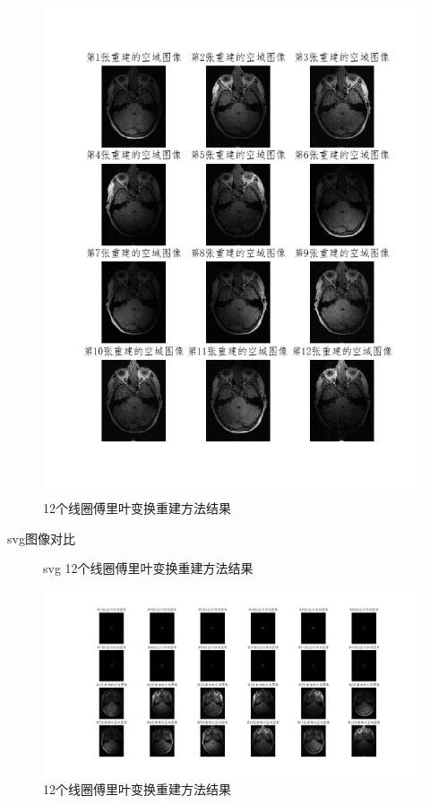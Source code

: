 \begin{figure}[H]
    \centering
    \includegraphics[width=1\linewidth]{fig/12image.png}
    \caption{12个线圈傅里叶变换重建方法结果}
    \label{fig:coil12recon}
\end{figure}


svg图像对比
\begin{figure}[H]
    \centering
    
    \caption{svg 12个线圈傅里叶变换重建方法结果}
    \label{fig:coil12recon svg}
\end{figure}


\begin{figure}[H]
    \centering
    \includegraphics[width=1\linewidth]{fig/12coil_recon_image.png}
    \caption{12个线圈傅里叶变换重建方法结果}
    \label{fig:coil12recon1}
\end{figure}



